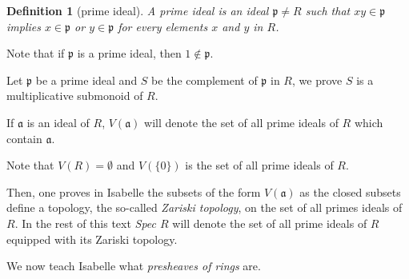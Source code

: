 \documentclass[12pt]{scrartcl}
\newtheorem{definition}[proposition]{Definition}
\newtheorem{ex}[proposition]{Exercise}
\begin{document}
\begin{definition}[prime ideal]
	A prime ideal is an ideal $\mathfrak{p} \neq R$ such that $x y \in \mathfrak{p}$ implies $x \in \mathfrak{p}$ or $y \in \mathfrak{p}$ for every elements $x$ and $y$ in $R$.
\end{definition}


Note that if $\mathfrak{p}$ is a prime ideal, then $1 \notin \mathfrak{p}$.


Let $\mathfrak{p}$ be a prime ideal and $S$ be the complement of $\mathfrak{p}$ in $R$,  we prove $S$ is a multiplicative submonoid of $R$.


If $\mathfrak{a}$ is an ideal of $R$, $V(\mathfrak{a})$ will denote the set of all prime ideals of $R$ which contain $\mathfrak{a}$. 


Note that $V(R) = \emptyset$ and $V(\lbrace 0 \rbrace)$ is the set of all prime ideals of $R$.




Then, one proves in Isabelle the subsets of the form $V(\mathfrak{a})$ as the closed subsets define a topology, the so-called \emph{Zariski topology}\label{zariskitop}, on the set of all primes ideals of $R$. In the rest of this text \emph{Spec $R$} will denote the set of all prime ideals of $R$ equipped with its Zariski topology.


We now teach Isabelle what \emph{presheaves of rings} are. 
\end{document}
